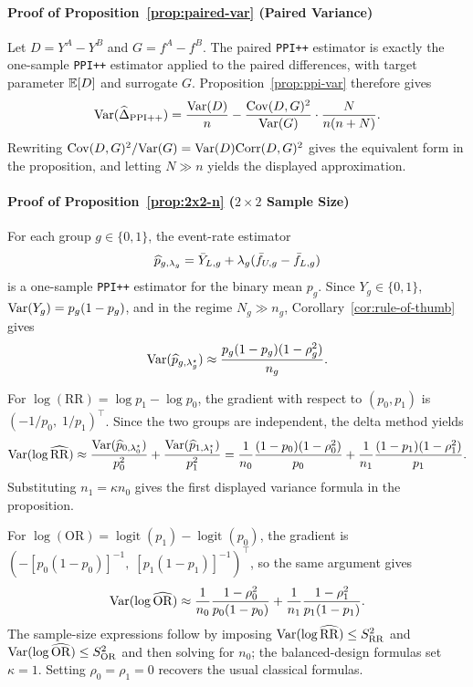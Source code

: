 \paragraph{Proof of Proposition~\ref{prop:paired-var} (Paired Variance)}
Let $D=Y^A-Y^B$ and $G=f^A-f^B$. The paired \texttt{PPI++} estimator is exactly
the one-sample \texttt{PPI++} estimator applied to the paired differences, with
target parameter $\mathbb{E}[D]$ and surrogate $G$. Proposition~\ref{prop:ppi-var}
therefore gives
\[
\mathrm{Var}(\widehat{\Delta}_{\mathrm{PPI++}})
= \frac{\mathrm{Var}(D)}{n}
- \frac{\mathrm{Cov}(D,G)^2}{\mathrm{Var}(G)}\cdot \frac{N}{n(n+N)}.
\]
Rewriting $\mathrm{Cov}(D,G)^2/\mathrm{Var}(G)=\mathrm{Var}(D)\mathrm{Corr}(D,G)^2$ gives the equivalent form in
the proposition, and letting $N\gg n$ yields the displayed approximation.

\paragraph{Proof of Proposition~\ref{prop:2x2-n} ($2\times2$ Sample Size)}
For each group $g\in\{0,1\}$, the event-rate estimator
\[
\widehat p_{g,\lambda_g}
= \bar Y_{L,g} + \lambda_g(\bar f_{U,g}-\bar f_{L,g})
\]
is a one-sample \texttt{PPI++} estimator for the binary mean $p_g$. Since
$Y_g\in\{0,1\}$, $\mathrm{Var}(Y_g)=p_g(1-p_g)$, and in the regime $N_g\gg n_g$,
Corollary~\ref{cor:rule-of-thumb} gives
\[
\mathrm{Var}(\widehat p_{g,\lambda_g^\star})
\approx \frac{p_g(1-p_g)(1-\rho_g^2)}{n_g}.
\]

For $\log(\mathrm{RR})=\log p_1-\log p_0$, the gradient with respect to
$(p_0,p_1)$ is $(-1/p_0,\;1/p_1)^\top$. Since the two groups are independent,
the delta method yields
\[
\mathrm{Var}(\log \widehat{\mathrm{RR}})
\approx
\frac{\mathrm{Var}(\widehat p_{0,\lambda_0^\star})}{p_0^2}
+ \frac{\mathrm{Var}(\widehat p_{1,\lambda_1^\star})}{p_1^2}
=
\frac{1}{n_0}\frac{(1-p_0)(1-\rho_0^2)}{p_0}
+ \frac{1}{n_1}\frac{(1-p_1)(1-\rho_1^2)}{p_1}.
\]
Substituting $n_1=\kappa n_0$ gives the first displayed variance formula in the
proposition.

For $\log(\mathrm{OR})=\operatorname{logit}(p_1)-\operatorname{logit}(p_0)$, the
gradient is
$(-[p_0(1-p_0)]^{-1},\; [p_1(1-p_1)]^{-1})^\top$, so the same argument gives
\[
\mathrm{Var}(\log \widehat{\mathrm{OR}})
\approx
\frac{1}{n_0}\frac{1-\rho_0^2}{p_0(1-p_0)}
+ \frac{1}{n_1}\frac{1-\rho_1^2}{p_1(1-p_1)}.
\]
The sample-size expressions follow by imposing
$\mathrm{Var}(\log \widehat{\mathrm{RR}})\le S_{\mathrm{RR}}^2$ and
$\mathrm{Var}(\log \widehat{\mathrm{OR}})\le S_{\mathrm{OR}}^2$ and then solving for
$n_0$; the balanced-design formulas set $\kappa=1$. Setting
$\rho_0=\rho_1=0$ recovers the usual classical formulas.

